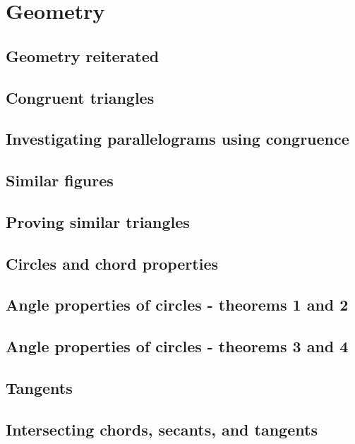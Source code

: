 \section{Geometry}
\begin{outline}

\0
\subsection{Geometry reiterated}

\0
\subsection{Congruent triangles}

\0
\subsection{Investigating parallelograms using congruence}

\0
\subsection{Similar figures}

\0
\subsection{Proving similar triangles}

\0
\subsection{Circles and chord properties}

\0
\subsection{Angle properties of circles - theorems 1 and 2}

\0
\subsection{Angle properties of circles - theorems 3 and 4}

\0
\subsection{Tangents}

\0
\subsection{Intersecting chords, secants, and tangents}
\end{outline}
